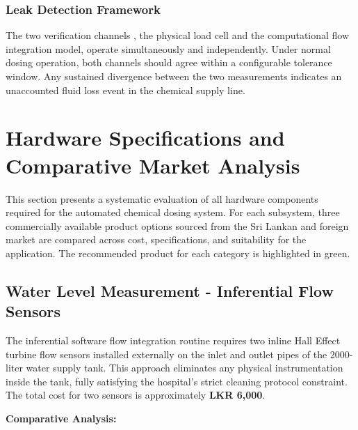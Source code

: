 \documentclass[12pt,a4paper]{article}
\begin{document}
\subsubsection*{Leak Detection Framework}

The two verification channels , the physical load cell and the computational flow integration model, operate simultaneously and independently. Under normal dosing operation, both channels should agree within a configurable tolerance window. Any sustained divergence between the two measurements indicates an unaccounted fluid loss event in the chemical supply line.
\newpage
\section{Hardware Specifications and Comparative Market Analysis}

This section presents a systematic evaluation of all hardware components required for the automated chemical dosing system. For each subsystem, three commercially available product options sourced from the Sri Lankan and foreign market are compared across cost, specifications, and suitability for the application. The recommended product for each category is highlighted in \colorbox{chosen}{green}.

\subsection{Water Level Measurement - Inferential Flow Sensors}

The inferential software flow integration routine requires two inline Hall Effect turbine flow sensors installed externally on the inlet and outlet pipes of the 2000-liter water supply tank. This approach eliminates any physical instrumentation inside the tank, fully satisfying the hospital's strict cleaning protocol constraint. The total cost for two sensors is approximately \textbf{LKR 6,000}.

\vspace{0.3cm}
\noindent\textbf{Comparative Analysis:}
\end{document}

